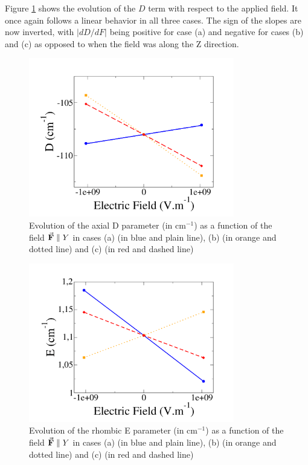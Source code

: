 \documentclass[12pt]{report}
\numberwithin{equation}{section}
\begin{document}
Figure \ref{fig:Ni_D_Y} shows the evolution of the $D$ term with respect to the applied field. It once again follows a linear behavior in all three cases.
The sign of the slopes are now inverted, with $|dD/dF|$ being positive for case (a) and negative for cases (b) and (c) as opposed to when the field was along the Z direction.


\begin{figure}[!ht]
    \centering
    \includegraphics[width=0.8\textwidth]{Images/D_E_Y.png}
    \caption[Evolution of the axial D parameter as a function of the field applied in cases (a), (b) and (c) for $\vec{\vb{F}}\parallel Y$]{Evolution of the axial D parameter (in cm$^{-1}$) as a function of the field $\vec{\vb{F}}\parallel Y$ in cases (a) (in blue and plain line), (b) (in orange and dotted line) and (c) (in red and dashed line)}
    \label{fig:Ni_D_Y}
\end{figure}

\begin{figure}[!ht]
    \centering
    \includegraphics[width=0.8\textwidth]{Images/E_E_Y.png}
    \caption[Evolution of the rhombic E parameter as a function of the field applied in cases (a), (b) and (c) for $\vec{\vb{F}}\parallel Y$]{Evolution of the rhombic E parameter (in cm$^{-1}$) as a function of the field $\vec{\vb{F}}\parallel Y$ in cases (a) (in blue and plain line), (b) (in orange and dotted line) and (c) (in red and dashed line)}
    \label{fig:Ni_E_Y}
\end{figure}
\end{document}
